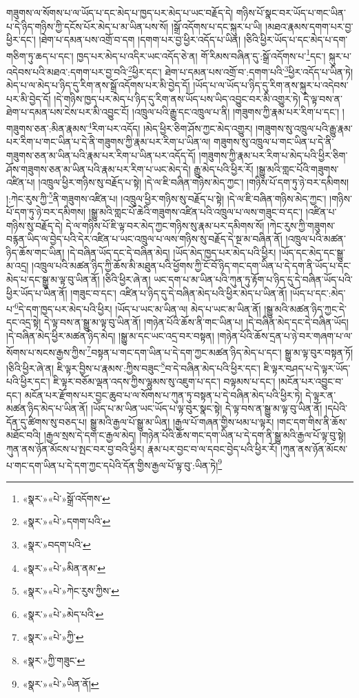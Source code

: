 གཟུགས་ལ་སོགས་པ་ལ་ཡོད་པ་དང་མེད་པ་ཁྱད་པར་མེད་པ་ཡང་བརྗོད་དེ། གཉིས་པོ་སྣང་བར་ཡོད་པ་གང་ཡིན་པ་དེ་ཉིད་གཉིས་ཀྱི་དངོས་པོར་མེད་པ་མ་ཡིན་པས་སོ། །སྒྲོ་འདོགས་པ་དང་སྐུར་པ་ཡི། །མཐའ་རྣམས་དགག་པར་བྱ་ཕྱིར་དང་། །ཐེག་པ་དམན་པས་འགྲོ་བ་དག །དགག་པར་བྱ་ཕྱིར་འདོད་པ་ཡིན། །ཅིའི་ཕྱིར་ཡོད་པ་དང་མེད་པ་དག་གཅིག་ཏུ་ཆད་པ་དང་། ཁྱད་པར་མེད་པ་འདིར་ཡང་འདོད་ཅེ་ན། གོ་རིམས་བཞིན་དུ་:སྒྲོ་འདོགས་པ་\footnote{«སྣར་»«པེ་»སྒྲོ་འདོགས་}དང་། སྐུར་པ་འདེབས་པའི་མཐའ་:དགག་པར་བྱ་བའི་\footnote{«སྣར་»«པེ་»དགག་པའི་}ཕྱིར་དང་། ཐེག་པ་དམན་པས་འགྲོ་བ་:དགག་པའི་\footnote{«སྣར་»བདག་པའི་}ཕྱིར་འདོད་པ་ཡིན་ཏེ། མེད་པ་ལ་མེད་པ་ཉིད་དུ་རིག་ནས་སྒྲོ་འདོགས་པར་མི་བྱེད་དོ། །ཡོད་པ་ལ་ཡོད་པ་ཉིད་དུ་རིག་ནས་སྐུར་པ་འདེབས་པར་མི་བྱེད་དོ། །དེ་གཉིས་ཁྱད་པར་མེད་པ་ཉིད་དུ་རིག་ནས་ཡོད་པས་ཡིད་འབྱུང་བར་མི་འགྱུར་ཏེ། དེ་ལྟ་བས་ན་ཐེག་པ་དམན་པས་ངེས་པར་མི་འབྱུང་ངོ། །འཁྲུལ་པའི་རྒྱུ་དང་འཁྲུལ་པ་ནི། །གཟུགས་ཀྱི་རྣམ་པར་རིག་པ་དང་། །གཟུགས་ཅན་:མིན་རྣམས་\footnote{«སྣར་»«པེ་»མིན་ནམ་}རིག་པར་འདོད། །མེད་ཕྱིར་ཅིག་ཤོས་ཀྱང་མེད་འགྱུར། །གཟུགས་སུ་འཁྲུལ་པའི་རྒྱུ་རྣམ་པར་རིག་པ་གང་ཡིན་པ་དེ་ནི་གཟུགས་ཀྱི་རྣམ་པར་རིག་པ་ཡིན་ལ། གཟུགས་སུ་འཁྲུལ་པ་གང་ཡིན་པ་དེ་ནི་གཟུགས་ཅན་མ་ཡིན་པའི་རྣམ་པར་རིག་པ་ཡིན་པར་འདོད་དོ། །གཟུགས་ཀྱི་རྣམ་པར་རིག་པ་མེད་པའི་ཕྱིར་ཅིག་ཤོས་གཟུགས་ཅན་མ་ཡིན་པའི་རྣམ་པར་རིག་པ་ཡང་མེད་དེ། རྒྱུ་མེད་པའི་ཕྱིར་རོ། །སྒྱུ་མའི་གླང་པོའི་གཟུགས་འཛིན་པ། །འཁྲུལ་ཕྱིར་གཉིས་སུ་བརྗོད་པ་སྟེ། །དེ་ལ་ཇི་བཞིན་གཉིས་མེད་ཀྱང་། །གཉིས་པོ་དག་ཏུ་ཉེ་བར་དམིགས། །:ཀེང་རུས་ཀྱི་\footnote{«སྣར་»«པེ་»ཀེང་རུས་ཀྱིས་}ནི་གཟུགས་འཛིན་པ། །འཁྲུལ་ཕྱིར་གཉིས་སུ་བརྗོད་པ་སྟེ། །དེ་ལ་ཇི་བཞིན་གཉིས་མེད་ཀྱང་། །གཉིས་པོ་དག་ཏུ་ཉེ་བར་དམིགས། །སྒྱུ་མའི་གླང་པོ་ཆེའི་གཟུགས་འཛིན་པའི་འཁྲུལ་པ་ལས་གཟུང་བ་དང་། །འཛིན་པ་གཉིས་སུ་བརྗོད་དེ། དེ་ལ་གཉིས་པོ་ཇི་ལྟ་བར་མེད་ཀྱང་གཉིས་སུ་རྣམ་པར་དམིགས་སོ། །ཀེང་རུས་ཀྱི་གཟུགས་བརྙན་ཡིད་ལ་བྱེད་པའི་དེར་འཛིན་པ་ཡང་འཁྲུལ་པ་ལས་གཉིས་སུ་བརྗོད་དེ་སྔ་མ་བཞིན་ནོ། །འཁྲུལ་པའི་མཚན་ཉིད་ཆོས་གང་ཡིན། །དེ་བཞིན་ཡོད་དང་དེ་བཞིན་མེད། །ཡོད་མེད་ཁྱད་པར་མེད་པའི་ཕྱིར། །ཡོད་དང་མེད་དང་སྒྱུ་མ་འདྲ། །འཁྲུལ་པའི་མཚན་ཉིད་ཀྱི་ཆོས་མི་མཐུན་པའི་ཕྱོགས་ཀྱི་ངོ་བོ་ཉིད་གང་དག་ཡིན་པ་དེ་དག་ནི་ཡོད་པ་དང་མེད་པ་དང་སྒྱུ་མ་ལྟ་བུ་ཡིན་ནོ། །ཅིའི་ཕྱིར་ཞེ་ན། ཡང་དག་པ་མ་ཡིན་པའི་ཀུན་ཏུ་རྟོག་པ་ཉིད་དུ་དེ་བཞིན་ཡོད་པའི་ཕྱིར་ཡོད་པ་ཡིན་ནོ། །གཟུང་བ་དང་། འཛིན་པ་ཉིད་དུ་དེ་བཞིན་མེད་པའི་ཕྱིར་མེད་པ་ཡིན་ནོ། །ཡོད་པ་དང་:མེད་པ་\footnote{«སྣར་»«པེ་»མེད་པའི་}དེ་དག་ཁྱད་པར་མེད་པའི་ཕྱིར། །ཡོད་པ་ཡང་མ་ཡིན་ལ། མེད་པ་ཡང་མ་ཡིན་ནོ། །སྒྱུ་མའི་མཚན་ཉིད་ཀྱང་དེ་དང་འདྲ་སྟེ། དེ་ལྟ་བས་ན་སྒྱུ་མ་ལྟ་བུ་ཡིན་ནོ། །གཉེན་པོའི་ཆོས་ནི་གང་ཡིན་པ། །དེ་བཞིན་མེད་དང་དེ་བཞིན་ཡོད། །དེ་བཞིན་མེད་ཕྱིར་མཚན་ཉིད་མེད། །སྒྱུ་མ་དང་ཡང་འདྲ་བར་བསྟན། །གཉེན་པོའི་ཆོས་དྲན་པ་ཉེ་བར་གཞག་པ་ལ་སོགས་པ་སངས་རྒྱས་ཀྱིས་\footnote{«སྣར་»«པེ་»ཀྱི་}བསྟན་པ་གང་དག་ཡིན་པ་དེ་དག་ཀྱང་མཚན་ཉིད་མེད་པ་དང་། སྒྱུ་མ་ལྟ་བུར་བསྟན་ཏོ། །ཅིའི་ཕྱིར་ཞེ་ན། ཇི་ལྟར་བྱིས་པ་རྣམས་:ཀྱིས་བཟུང་\footnote{«སྣར་»ཀྱི་གཟུང་}བ་དེ་བཞིན་མེད་པའི་ཕྱིར་དང་། ཇི་ལྟར་བཤད་པ་དེ་ལྟར་ཡོད་པའི་ཕྱིར་དང་། ཇི་ལྟར་བཅོམ་ལྡན་འདས་ཀྱིས་ལྷུམས་སུ་འཇུག་པ་དང་། བལྟམས་པ་དང་། །མངོན་པར་འབྱུང་བ་དང་། མངོན་པར་རྫོགས་པར་བྱང་ཆུབ་པ་ལ་སོགས་པ་ཀུན་ཏུ་བསྟན་པ་དེ་བཞིན་མེད་པའི་ཕྱིར་ཏེ། དེ་ལྟར་ན་མཚན་ཉིད་མེད་པ་ཡིན་ནོ། །ཡོད་པ་མ་ཡིན་ཡང་ཡོད་པ་ལྟ་བུར་སྣང་སྟེ། དེ་ལྟ་བས་ན་སྒྱུ་མ་ལྟ་བུ་ཡིན་ནོ། །དཔེའི་དོན་དུ་ཚིགས་སུ་བཅད་པ། སྒྱུ་མའི་རྒྱལ་པོ་སྒྱུ་མ་ཡིན། །རྒྱལ་པོ་གཞན་གྱིས་ཕམ་པ་ལྟར། །གང་དག་གིས་ནི་ཆོས་མཐོང་བའི། །རྒྱལ་སྲས་དེ་དག་ང་རྒྱལ་མེད། །གཉེན་པོའི་ཆོས་གང་དག་ཡིན་པ་དེ་དག་ནི་སྒྱུ་མའི་རྒྱལ་པོ་ལྟ་བུ་སྟེ། ཀུན་ནས་ཉོན་མོངས་པ་སྤང་བར་བྱ་བའི་ཕྱིར། རྣམ་པར་བྱང་བ་ལ་དབང་བྱེད་པའི་ཕྱིར་རོ། །ཀུན་ནས་ཉོན་མོངས་པ་གང་དག་ཡིན་པ་དེ་དག་ཀྱང་དཔེའི་དོན་གྱིས་རྒྱལ་པོ་ལྟ་བུ་:ཡིན་ཏེ།\footnote{«སྣར་»«པེ་»ཡིན་ནོ།} 